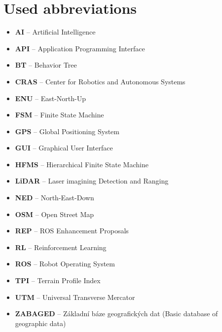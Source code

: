     \section*{Used abbreviations}
        \begin{itemize}
            \item \textbf{AI} -- Artificial Intelligence
            \item \textbf{API} -- Application Programming Interface
            \item \textbf{BT} -- Behavior Tree
            \item \textbf{CRAS} -- Center for Robotics and Autonomous Systems
            \item \textbf{ENU} -- East-North-Up
            \item \textbf{FSM} -- Finite State Machine
            \item \textbf{GPS} -- Global Positioning System
            \item \textbf{GUI} -- Graphical User Interface
            \item \textbf{HFMS} -- Hierarchical Finite State Machine
            \item \textbf{LiDAR} -- Laser imagining Detection and Ranging
            \item \textbf{NED} -- North-East-Down
            \item \textbf{OSM} -- Open Street Map
            \item \textbf{REP} -- ROS Enhancement Proposals
            \item \textbf{RL} -- Reinforcement Learning
            \item \textbf{ROS} -- Robot Operating System
            \item \textbf{TPI} -- Terrain Profile Index
            \item \textbf{UTM} -- Universal Transverse Mercator
            \item \textbf{ZABAGED} -- Základní báze geografických dat (Basic database of geographic data)
        \end{itemize}
    